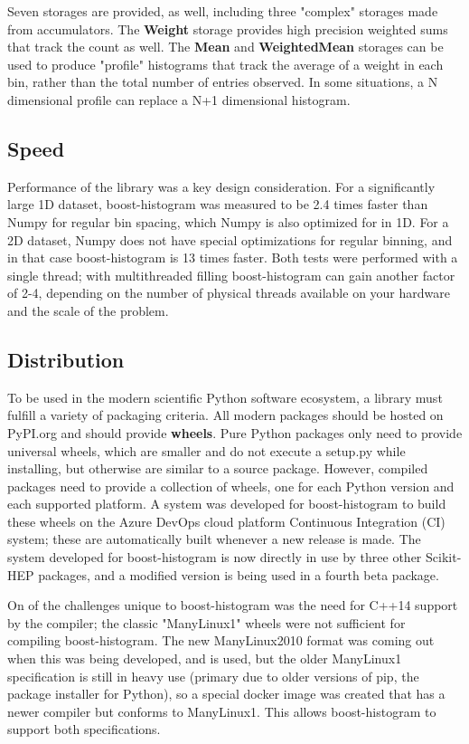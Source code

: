 \documentclass{webofc}
\begin{document}
Seven storages are provided, as well, including three "complex" storages made from accumulators. The \textbf{Weight} storage provides high precision weighted sums that track the count as well. The \textbf{Mean} and \textbf{WeightedMean} storages can be used to produce "profile" histograms that track the average of a weight in each bin, rather than the total number of entries observed. In some situations, a N dimensional profile can replace a N+1 dimensional histogram.

\subsection{Speed}

Performance of the library was a key design consideration. For a significantly large 1D dataset, boost-histogram was measured to be 2.4 times faster than Numpy for regular bin spacing, which Numpy is also optimized for in 1D. For a 2D dataset, Numpy does not have special optimizations for regular binning, and in that case boost-histogram is 13 times faster. Both tests were performed with a single thread; with multithreaded filling boost-histogram can gain another factor of 2-4, depending on the number of physical threads available on your hardware and the scale of the problem.

\subsection{Distribution}

To be used in the modern scientific Python software ecosystem, a library must fulfill a variety of packaging criteria. All modern packages should be hosted on PyPI.org and should provide \textbf{wheels}. Pure Python packages only need to provide universal wheels, which are smaller and do not execute a setup.py while installing, but otherwise are similar to a source package. However, compiled packages need to provide a collection of wheels, one for each Python version and each supported platform. A system was developed for boost-histogram to build these wheels on the Azure DevOps cloud platform Continuous Integration (CI) system; these are automatically built whenever a new release is made. The system developed for boost-histogram is now directly in use by three other Scikit-HEP packages, and a modified version is being used in a fourth beta package.

On of the challenges unique to boost-histogram was the need for C++14 support by the compiler; the classic "ManyLinux1" wheels were not sufficient for compiling boost-histogram. The new ManyLinux2010 format was coming out when this was being developed, and is used, but the older ManyLinux1 specification is still in heavy use 
(primary due to older versions of pip, the package installer for Python), so a special docker image was created that has a newer compiler but conforms to ManyLinux1. This allows boost-histogram to support both specifications.
\end{document}
